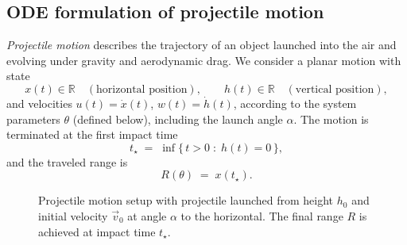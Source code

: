 \subsection{ODE formulation of projectile motion}
\label{subsec:proj_ode}
\emph{Projectile motion} describes the trajectory of an object launched into the
air and evolving under gravity and aerodynamic drag. We consider a planar motion
with state
\begin{equation*}
x(t)\in\mathbb{R} \quad (\text{horizontal position}),\qquad
h(t)\in\mathbb{R} \quad (\text{vertical position}),
\end{equation*}
and velocities $u(t)=\dot{x}(t)$, $w(t)=\dot{h}(t)$, according to the system
parameters $\theta$ (defined below), including the launch angle $\alpha$. The
motion is terminated at the first impact time
\begin{equation*}
t_\star \;=\; \inf\{\, t>0 \;:\; h(t)=0 \,\},
\end{equation*}
and the traveled range is 
\begin{equation}
\label{eq:proj_range}
R(\theta) \;=\; x(t_\star).
\end{equation}


\begin{figure}[H]
\centering
{}
\caption{Projectile motion setup with projectile launched from height $h_0$ and initial velocity $\vec{v}_0$ at angle $\alpha$ to the horizontal. The final range $R$ is achieved at impact time $t_\star$.}
\label{fig:projectile_motion_setup}
\end{figure}


